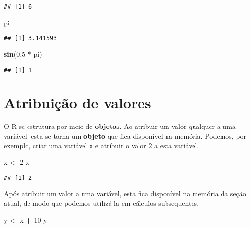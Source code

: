 \documentclass[
]{book}
\newenvironment{Shaded}{\begin{snugshade}}{\end{snugshade}}
\newcommand{\DecValTok}[1]{\textcolor[rgb]{0.00,0.00,0.81}{#1}}
\newcommand{\FloatTok}[1]{\textcolor[rgb]{0.00,0.00,0.81}{#1}}
\newcommand{\KeywordTok}[1]{\textcolor[rgb]{0.13,0.29,0.53}{\textbf{#1}}}
\newcommand{\NormalTok}[1]{#1}
\newcommand{\OperatorTok}[1]{\textcolor[rgb]{0.81,0.36,0.00}{\textbf{#1}}}
\newcommand{\StringTok}[1]{\textcolor[rgb]{0.31,0.60,0.02}{#1}}
\begin{document}
\begin{verbatim}
## [1] 6
\end{verbatim}

\begin{Shaded}
\begin{Highlighting}[]
\NormalTok{pi}
\end{Highlighting}
\end{Shaded}

\begin{verbatim}
## [1] 3.141593
\end{verbatim}

\begin{Shaded}
\begin{Highlighting}[]
\KeywordTok{sin}\NormalTok{(}\FloatTok{0.5} \OperatorTok{*}\StringTok{ }\NormalTok{pi)}
\end{Highlighting}
\end{Shaded}

\begin{verbatim}
## [1] 1
\end{verbatim}

\hypertarget{atribuiuxe7uxe3o-de-valores}{%
\section{Atribuição de valores}\label{atribuiuxe7uxe3o-de-valores}}

O R se estrutura por meio de \textbf{objetos}. Ao atribuir um valor qualquer a uma variável, esta se torna um \textbf{objeto} que fica disponível na memória. Podemos, por exemplo, criar uma variável \texttt{x} e atribuir o valor \(2\) a esta variável.

\begin{Shaded}
\begin{Highlighting}[]
\NormalTok{x <-}\StringTok{ }\DecValTok{2}
\NormalTok{x}
\end{Highlighting}
\end{Shaded}

\begin{verbatim}
## [1] 2
\end{verbatim}

Após atribuir um valor a uma variável, esta fica disponível na memória da seção atual, de modo que podemos utilizá-la em cálculos subsequentes.

\begin{Shaded}
\begin{Highlighting}[]
\NormalTok{y <-}\StringTok{ }\NormalTok{x }\OperatorTok{+}\StringTok{ }\DecValTok{10}
\NormalTok{y}
\end{Highlighting}
\end{Shaded}
\end{document}
